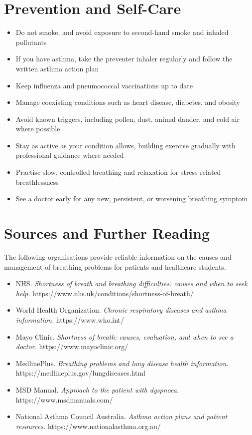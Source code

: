\section*{Prevention and Self-Care}
\begin{itemize}
    \item Do not smoke, and avoid exposure to second-hand smoke and inhaled pollutants
    \item If you have asthma, take the preventer inhaler regularly and follow the written asthma action plan
    \item Keep influenza and pneumococcal vaccinations up to date
    \item Manage coexisting conditions such as heart disease, diabetes, and obesity
    \item Avoid known triggers, including pollen, dust, animal dander, and cold air where possible
    \item Stay as active as your condition allows, building exercise gradually with professional guidance where needed
    \item Practise slow, controlled breathing and relaxation for stress-related breathlessness
    \item See a doctor early for any new, persistent, or worsening breathing symptom
\end{itemize}

\section*{Sources and Further Reading}
The following organisations provide reliable information on the causes and management of breathing problems for patients and healthcare students.

\begin{itemize}
    \item NHS. \textit{Shortness of breath and breathing difficulties: causes and when to seek help.} https://www.nhs.uk/conditions/shortness-of-breath/
    \item World Health Organization. \textit{Chronic respiratory diseases and asthma information.} https://www.who.int/
    \item Mayo Clinic. \textit{Shortness of breath: causes, evaluation, and when to see a doctor.} https://www.mayoclinic.org/
    \item MedlinePlus. \textit{Breathing problems and lung disease health information.} https://medlineplus.gov/lungdiseases.html
    \item MSD Manual. \textit{Approach to the patient with dyspnoea.} https://www.msdmanuals.com/
    \item National Asthma Council Australia. \textit{Asthma action plans and patient resources.} https://www.nationalasthma.org.au/
\end{itemize}

